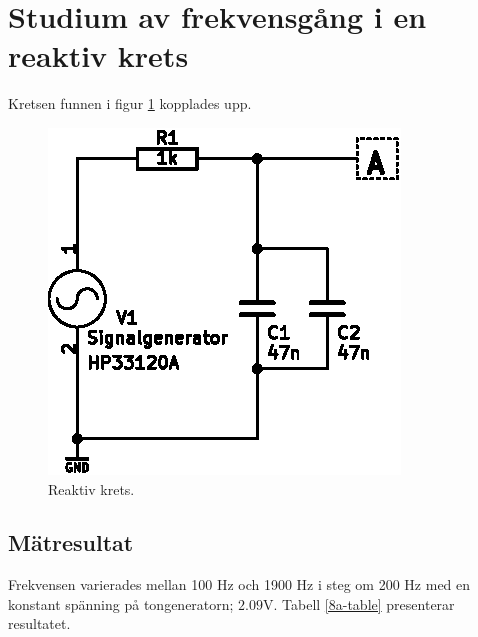 \documentclass[11pt,a4paper]{article}
\begin{document}
\section{Studium av frekvensgång i en reaktiv krets}\label{}
Kretsen funnen i figur \ref{fig:8-schem} kopplades upp.
\begin{figure}[htbp]
    \centering
        \includegraphics[scale=1.0]{img/8-schem.eps}
    \caption{Reaktiv krets.}
    \label{fig:8-schem}
\end{figure}


\subsection{Mätresultat}\label{}

Frekvensen varierades mellan 100 \si{\hertz} och 1900 \si{\hertz} i steg om 200 \si{\hertz} med en konstant spänning på tongeneratorn; $2.09\si{\volt}$. Tabell \ref{8a-table} presenterar resultatet.
\end{document}
